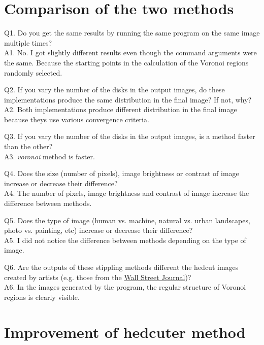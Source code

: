 \documentclass[11pt]{article}
\begin{document}
\section{Comparison of the two methods}

Q1. Do you get the same results by running the same program on the same image multiple times?\\
A1. No. I got  slightly different results even though the command arguments were the same.
Because the starting points in the calcu\-lation of the Voronoi regions randomly selected.

Q2. If you vary the number of the disks in the output images,  do these implementations produce
the same distribution in the final image? If not, why?\\
A2. Both implementations produce different distribution in the final image because theys use
various convergence criteria.

Q3. If you vary the number of the disks in the output images,  is a method faster than the other? \\
A3. {\it voronoi} method is faster.

Q4. Does the size (number of pixels), image brightness or contrast of image increase or decrease their difference? \\
A4. The number of pixels, image brightness and contrast of image increase the difference between methods.

Q5. Does the type of image (human vs. machine,  natural vs. urban landscapes, photo vs. painting, etc) increase or
decrease their difference? \\
A5. I did not notice the difference between methods depending on the type of image.

Q6. Are the outputs of these stippling methods different  the hedcut images created by artists (e.g. those from the
\href{http://www.wsj.com/articles/SB10001424052748704207504575129961786135180}{Wall Street Journal})? \\
A6. In the images generated by the program, the regular structure of Voronoi regions is clearly visible.

\section{Improvement of hedcuter method}
\end{document}
